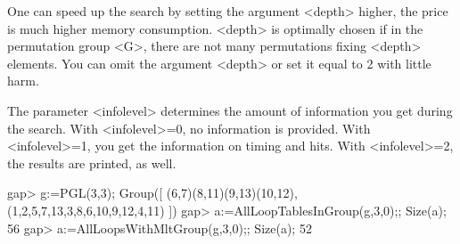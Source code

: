 One can speed up the search by setting the argument <depth> higher, the price
is much higher memory consumption. <depth> is optimally chosen if in the permutation group <G>, there are not
many permutations fixing <depth> elements. You can omit the argument <depth> or set it equal to
2 with little harm.

The parameter <infolevel> determines the amount of information you get during
the search. With <infolevel>=0, no information is provided.
With <infolevel>=1, you get the information on timing and hits.
With <infolevel>=2, the results are printed, as well.

\beginexample
gap> g:=PGL(3,3);
Group([ (6,7)(8,11)(9,13)(10,12), (1,2,5,7,13,3,8,6,10,9,12,4,11) ])
gap> a:=AllLoopTablesInGroup(g,3,0);; Size(a);
56
gap> a:=AllLoopsWithMltGroup(g,3,0);; Size(a);
52
\endexample
